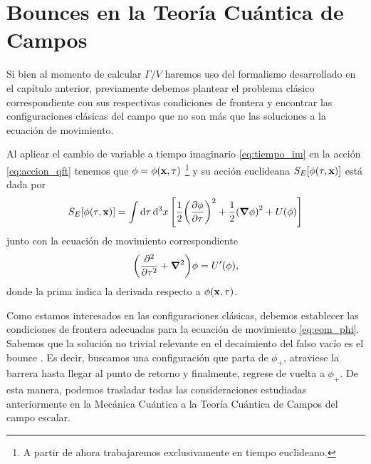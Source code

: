 \section{Bounces en la Teoría Cuántica de Campos}

Si bien al momento de calcular $\Gamma/V$ haremos uso del formalismo desarrollado en el capítulo anterior,
previamente debemos plantear el problema clásico correspondiente con sus respectivas condiciones de frontera y encontrar 
las configuraciones clásicas del campo que no son más que las soluciones a la ecuación de movimiento.  

Al aplicar el cambio de variable a tiempo imaginario \eqref{eq:tiempo_im} en la acción \eqref{eq:accion_qft} tenemos que $\phi = \phi\qty(\vb{x}, \tau)$ \footnote{A partir de ahora trabajaremos exclusivamente en tiempo euclideano. 
} 
y su acción euclideana $S_E\qty[\phi\qty(\tau, \vb{x})]$ está dada por
\begin{equation}
S_E\qty[\phi\qty(\tau, \vb{x})] = \int \dd{\tau} \dd[3]{x} \qty[\frac{1}{2}\qty(\pdv{\phi}{\tau})^2 + \frac{1}{2}\qty(\grad{\phi})^2 + U\qty(\phi)]
\end{equation}
junto con la ecuación de movimiento correspondiente
\begin{equation} \label{eq:eom_phi}
\qty(\pdv[2]{\tau} + \grad{}^2)\phi = U'\qty(\phi),
\end{equation}
donde la prima indica la derivada respecto a $\phi\qty(\vb{x}, \tau)$. 

Como estamos interesados en las configuraciones clásicas,
debemos establecer las condiciones de frontera adecuadas para la ecuación de movimiento \eqref{eq:eom_phi}. Sabemos que la solución no trivial relevante en el decaimiento del falso vacío es el bounce \cite{coleman1977fate}. Es decir, buscamos una configuración que parta de $\phi_+$, atraviese la barrera hasta llegar al punto de retorno y finalmente, regrese de vuelta a $\phi_+$.  De esta manera, podemos trasladar todas las consideraciones estudiadas anteriormente en la Mecánica Cuántica a la Teoría Cuántica de Campos del campo escalar. 


